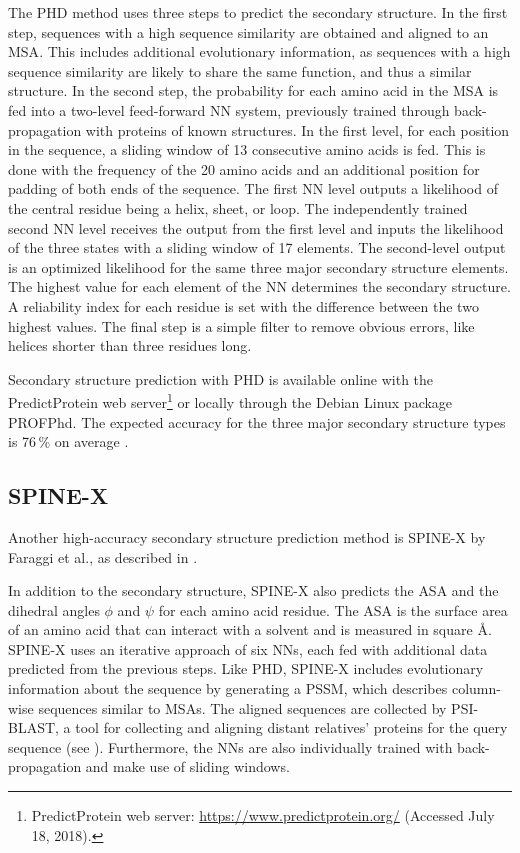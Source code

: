 The \ac{PHD} method uses three steps to predict the secondary structure. %
In the first step, sequences with a high sequence similarity are obtained and aligned to an \ac{MSA}. This includes additional evolutionary information, as sequences with a high sequence similarity are likely to share the same function, and thus a similar structure. %
In the second step, the probability for each amino acid in the \ac{MSA} is fed into a two-level feed-forward \ac{NN} system, previously trained through  back-propagation with proteins of known structures. 
In the first level, for each position in the sequence, a sliding window of 13 consecutive amino acids is fed. This is done with the frequency of the 20 amino acids and an additional position for padding of both ends of the sequence.
The first \ac{NN} level outputs a likelihood of the central residue being a helix, sheet, or loop.  
The independently trained second \ac{NN} level receives the output from the first level and inputs the likelihood of the three states with a sliding window of 17 elements. The second-level output is an optimized likelihood for the same three major secondary structure elements. 
The highest value for each element of the \ac{NN} determines the secondary structure. A reliability index for each residue is set with the difference between the two highest values. %
The final step is a simple filter to remove obvious errors, like  helices shorter than three residues long.

Secondary structure prediction with \ac{PHD} is available online with the PredictProtein web server\footnote{PredictProtein web server: \url{https://www.predictprotein.org/} (Accessed July 18, 2018).} or locally through the Debian Linux package PROFPhd. The expected accuracy for the three major secondary structure types is 76\,\% on average \cite{Rost.2004}.


\subsection{SPINE-X}
\label{ssec:spinex}

Another high-accuracy secondary structure prediction method is SPINE-X  by Faraggi et al., as described in \cite{Faraggi.2012}.

In addition to the secondary structure, SPINE-X also predicts the \ac{ASA} and the  dihedral  angles $\phi$ and $\psi$ for each amino acid residue. 
The \ac{ASA} is the surface area of an amino acid that can interact with a solvent and is measured in square \AA . 
SPINE-X uses an iterative approach of six \acp{NN}, each fed with additional data predicted from the previous steps. 
Like \ac{PHD}, SPINE-X includes evolutionary information about the sequence by generating a \ac{PSSM}, which describes column-wise sequences similar to \acp{MSA}. The aligned sequences are collected by PSI-BLAST, a tool for collecting and aligning distant relatives' proteins for the query sequence (see \cite{Altschul.1998}).
Furthermore, the \acp{NN} are also individually trained with back-propagation and make use of sliding windows. 


